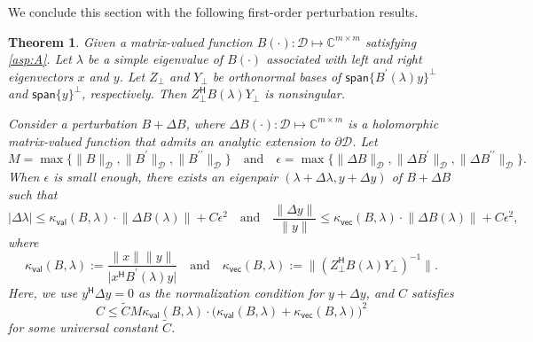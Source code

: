 \documentclass[a4paper,11pt]{article}
\newtheorem{theorem}{Theorem}
\newcommand{\Htran}{\mathsf{H}}
\newcommand{\defi}{:=}
\newcommand{\C}{\mathbb{C}}
\newcommand{\region}{\mathcal{D}}
\newcommand{\kval}{\kappa_{\mathsf{val}}}
\newcommand{\kvec}{\kappa_{\mathsf{vec}}}
\providecommand{\spa}[1]{\mathsf{span}\{#1\}}
\providecommand{\abs}[1]{\lvert#1\rvert}
\providecommand{\norm}[1]{\lVert#1\rVert}
\providecommand{\bignorm}[1]{\bigl\lVert#1\bigr\rVert}
\begin{document}
We conclude this section with the following first-order perturbation results.
\begin{theorem}
    \label{lem:pert}
    Given a matrix-valued function $B(\cdot)\colon \region\mapsto\C^{m\times m}$ satisfying \cref{asp:A}. Let $\lambda$ be a simple eigenvalue of $B(\cdot)$ associated with left and right eigenvectors $x$ and $y$.
    Let $Z_{\perp}$ and $Y_{\perp}$ be orthonormal bases of $\spa{B^{\prime}(\lambda)y}^{\perp}$ and $\spa{y}^{\perp}$, respectively. Then $Z_{\perp}^{\Htran}B(\lambda)Y_{\perp}$ is nonsingular.

    Consider a perturbation $B+\Delta B$, where $\Delta B(\cdot)\colon \region\mapsto \C^{m\times m}$ is a holomorphic matrix-valued function that admits an analytic extension to $\partial\region$.
    Let 
    \begin{equation*}
        M = \max\bigl\{ \norm{B}_{\region},\norm{B^{\prime}}_{\region},\norm{B^{\prime\prime}}_{\region}\bigr\}
        \quad\text{and}\quad 
        \epsilon = \max\bigl\{\norm{\Delta B}_{\region},\norm{\Delta B^{\prime}}_{\region}, \norm{\Delta B^{\prime\prime}}_{\region}\bigr\}.
    \end{equation*}
    When $\epsilon$ is small enough, there exists an eigenpair $(\lambda +\Delta \lambda,y+\Delta y)$ of $B+\Delta B$ such that
    \begin{equation*}
        \abs{\Delta \lambda} \leq \kval(B,\lambda)\cdot\norm{\Delta B(\lambda)} +C \epsilon^{2} 
        \quad\text{and}\quad  
        \frac{\norm{\Delta y}}{\norm{y}} \leq \kvec(B,\lambda)\cdot\norm{\Delta B(\lambda)}+C\epsilon^{2},
    \end{equation*}
    where
    \begin{equation*}
        \kval(B,\lambda) \defi \frac{\norm{x}\norm{y}}{\abs{x^{\Htran}B^{\prime}(\lambda)y}}
        \quad \text{and}\quad 
        \kvec(B,\lambda)\defi \bignorm{(Z_{\perp}^{\Htran}B(\lambda)Y_{\perp})^{-1}}.
    \end{equation*} 
    Here, we use $y^{\Htran}\Delta y= 0$ as the normalization condition for $y+\Delta y$, and $C$ satisfies
    \begin{equation*}
        C\leq \widetilde{C}M\kval(B,\lambda)\cdot\bigl(\kval(B,\lambda)+\kvec(B,\lambda)\bigr)^{2}
    \end{equation*}
    for some universal constant $\widetilde{C}$.
\end{theorem}
\end{document}
